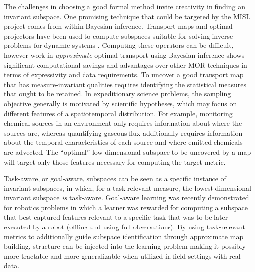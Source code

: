 The challenges in choosing a good formal method invite creativity in finding an invariant subspace.
One promising technique that could be targeted by the MISL project comes from within Bayesian inference.
Transport maps and optimal projectors have been used to compute subspaces suitable for solving inverse problems for dynamic systems \autocite{cui2014likelihood,spantini2018inference,spantini2015optimal}.
Computing these operators can be difficult, however work in \emph{approximate} optimal transport using Bayesian inference \autocite{spantini2018inference,spantini2019coupling,zahm2022certified,villani2008optimal,bigoni2019greedy} shows significant computational savings and advantages over other MOR techniques in terms of expressivity and data requirements.
To uncover a good transport map that has measure-invariant qualities requires identifying the statistical measures that ought to be retained.
In expeditionary science problems, the sampling objective generally is motivated by scientific hypotheses, which may focus on different features of a spatiotemporal distribution.
For example, monitoring chemical sources in an environment only requires information about where the sources are, whereas quantifying gaseous flux additionally requires information about the temporal characteristics of each source and where emitted chemicals are advected.
The ``optimal'' low-dimensional subspace to be uncovered by a map will target only those features necessary for computing the target metric.

Task-aware, or goal-aware, subspaces can be seen as a specific instance of invariant subspaces, in which, for a task-relevant measure, the lowest-dimensional invariant subspace \emph{is} task-aware.
Goal-aware learning was recently demonstrated for robotics problems \autocite{nair2020goal} in which a learner was rewarded for computing a subspace that best captured features relevant to a specific task that was to be later executed by a robot (offline and using full observations).
By using task-relevant metrics to additionally guide subspace identification through approximate map building, structure can be injected into the learning problem making it possibly more tractable and more generalizable when utilized in field settings with real data.


